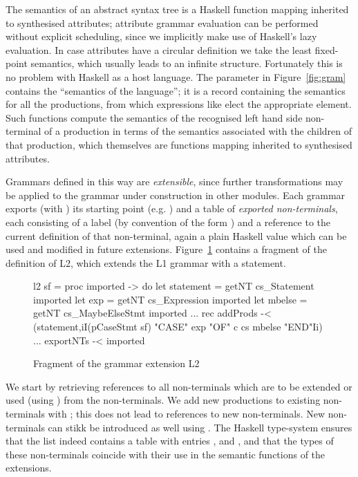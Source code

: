 The semantics of an abstract syntax tree is a Haskell function mapping inherited to synthesised attributes; attribute grammar evaluation can be performed without explicit scheduling, since we implicitly make use of Haskell's lazy evaluation. In case attributes have a circular definition we take the least fixed-point semantics, which usually leads to an infinite structure. Fortunately this is no problem with Haskell as a host language.
The parameter  in Figure~\ref{fig:gram}  contains the ``semantics of the language''; it is a record containing the semantics for all the productions, from which expressions like  elect the appropriate element. Such functions compute the semantics of the recognised left hand side non-terminal of a production in terms of the semantics associated with the children of that production, which themselves are  functions mapping inherited to synthesised attributes.


Grammars defined in this way are \emph{extensible}, since further transformations may be applied to the grammar under construction in other modules.  
Each grammar exports (with ) its starting point (e.g. ) and a table  of
\emph{exported non-terminals}, each consisting of a label (by convention of  the
form ) and a reference to the current definition of that non-terminal, again a plain Haskell value which can be used and modified in future extensions.
Figure~\ref{fig:gram2} contains a fragment of the definition of L2, 
which extends the L1 grammar with a  statement.
\begin{figure}[th]
\begin{center}
\begin{haskell}
l2 sf = proc imported -> do
     let statement = getNT cs_Statement     imported 
     let exp       = getNT cs_Expression    imported 
     let mbelse    = getNT cs_MaybeElseStmt imported 
     ...
     rec addProds -< (statement,iI(pCaseStmt sf) "CASE" exp "OF" 
                                                 c cs mbelse "END"Ii)
     ...
     exportNTs -< imported
\end{haskell} 
\vspace{-15pt}
\caption{Fragment of the grammar extension L2}
\label{fig:gram2}
\end{center}
\end{figure}
We start by retrieving references to all non-terminals which are to be extended or used (using ) from the  non-terminals.
We add new productions to existing non-terminals with ; this does not lead to references to new non-terminals.
New non-terminals can stikk be introduced as well using .
The Haskell type-system ensures that 
the  list indeed contains a table with entries , 
 and , 
and that the types of these non-terminals coincide with their use in the semantic functions of
the extensions.

